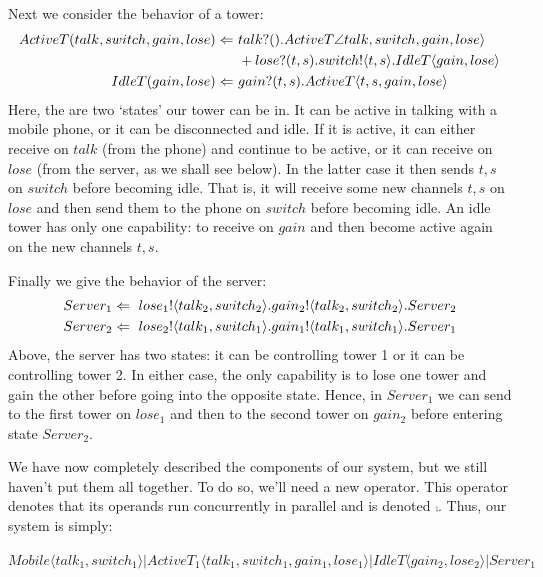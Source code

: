 	Next we consider the behavior of a tower:
	\begin{align*}
		ActiveT(talk,switch,gain,lose) \Leftarrow\  & {talk}?({}).ActiveT\angle talk,switch,gain,lose\rangle \\  
		 & +{lose}?({t,s}).{switch}!\langle{t,s}\rangle.IdleT\langle gain, lose\rangle\\
		IdleT(gain,lose) \Leftarrow\  & {gain}?({t,s}).ActiveT\langle t,s,gain,lose\rangle\\
	\end{align*}
Here, the are two `states' our tower can be in.  
It can be active in talking with a mobile phone, or it can be disconnected and idle.  
If it is active, it can either receive on $talk$ (from the phone) and continue to be active, or it can receive on $lose$ (from the server, as we shall see below).  
In the latter case it then sends $t,s$ on $switch$ before becoming idle.  
That is, it will receive some new channels $t,s$ on $lose$ and then send them to the phone on $switch$ before becoming idle.  
An idle tower has only one capability: to receive on $gain$ and then become active again on the new channels $t,s$.

Finally we give the behavior of the server:
\begin{align*}
	Server_1 \Leftarrow\  {lose_1}!\langle{talk_2,switch_2}\rangle. {gain_2}!\langle{talk_2,switch_2}\rangle. Server_2\\
	Server_2 \Leftarrow\  {lose_2}!\langle{talk_1,switch_1}\rangle. {gain_1}!\langle{talk_1,switch_1}\rangle. Server_1
\end{align*}
Above, the server has two states: it can be controlling tower 1 or it can be controlling tower 2.  
In either case, the only capability is to lose one tower and gain the other before going into the opposite state.  
Hence, in $Server_1$ we can send to the first tower on $lose_1$ and then to the second tower on $gain_2$ before entering state $Server_2$.

We have now completely described the components of our system, but we still haven't put them all together.  
To do so, we'll need a new operator.  
This operator denotes that its operands run concurrently in parallel and is denoted $\comp$.  
Thus, our system is simply:
\begin{center}
	\small{$\textstyle Mobile\langle talk_1,switch_1\rangle|ActiveT_1\langle talk_1,switch_1,gain_1,lose_1\rangle|IdleT\langle gain_2,lose_2\rangle|Server_1$}
\end{center}

